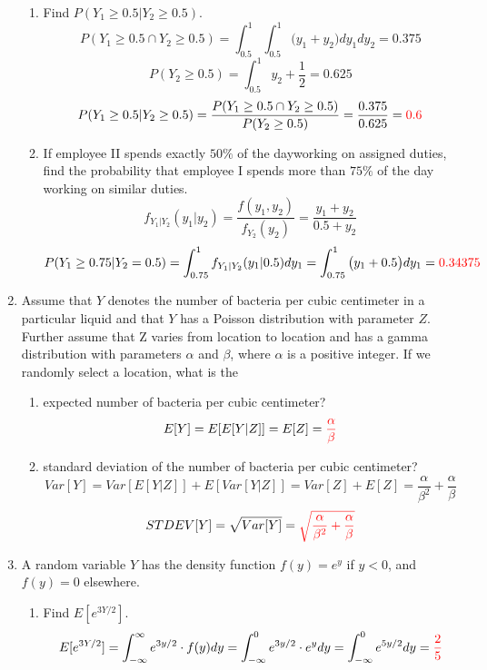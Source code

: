 \documentclass{article}
\newcommand{\intersect}{\cap}
\begin{document}
\begin{enumerate}
\begin{enumerate}
        \item Find $P(Y_1 \geq 0.5|Y_2 \geq 0.5)$.
        \[
            P(Y_1 \geq 0.5 \intersect Y_2 \geq 0.5) = \int_{0.5}^1 \int_{0.5}^1 \big(y_1+y_2\big) dy_1dy_2 = 0.375
        \]
        \[
            P(Y_2 \geq 0.5) = \int_{0.5}^1 y_2+\frac{1}{2} = 0.625
        \]
        \[
            P(Y_1 \geq 0.5|Y_2 \geq 0.5) = \frac{P(Y_1 \geq 0.5 \intersect Y_2 \geq 0.5)}{P(Y_2 \geq 0.5)} = \frac{0.375}{0.625}=\textcolor{red}{0.6}
        \]
        \item If employee II spends exactly $50\%$ of the dayworking on assigned duties, find the
        probability that employee I spends more than $75\%$ of the day working on similar duties.
        \[
            f_{Y_1|Y_2}(y_1|y_2)=\frac{f(y_1,y_2)}{f_{Y_2}(y_2)}=\frac{y_1+y_2}{0.5+y_2}
        \]
        \[
            P(Y_1 \geq 0.75 | Y_2 = 0.5) = \int_{0.75}^1 f_{Y_1|Y_2}(y_1|0.5) dy_1 = \int_{0.75}^1 \big(y_1+0.5\big) dy_1 = \textcolor{red}{0.34375}
        \]
    \end{enumerate}
\pagebreak
    \item Assume that $Y$ denotes the number of bacteria per cubic centimeter in a particular liquid and that $Y$ has a Poisson distribution with parameter $Z$. Further assume that Z varies from location to location and has a gamma distribution with parameters $\alpha$ and $\beta$, where $\alpha$ is a positive integer. If we randomly select a location, what is the
    \begin{enumerate}
        \item expected number of bacteria per cubic centimeter?
        \[
            E[Y] = E[E[Y|Z]]=E[Z]=\textcolor{red}{\frac{\alpha}{\beta}}
        \]
        \item standard deviation of the number of bacteria per cubic centimeter?
        \[
            Var[Y] = Var[E[Y|Z]]+E[Var[Y|Z]]= Var[Z]+E[Z] = \frac{\alpha}{\beta^2}+\frac{\alpha}{\beta}
        \]
        \[
            STDEV[Y]=\sqrt{Var[Y]}=\textcolor{red}{\sqrt{\frac{\alpha}{\beta^2}+\frac{\alpha}{\beta}}}
        \]
    \end{enumerate}
    \item A random variable $Y$ has the density function $f(y) = e^y$ if $y < 0$, and $f(y) = 0$ elsewhere.
    \begin{enumerate}
        \item Find $E[e^{3Y/2}]$.
        \[
            E[e^{3Y/2}]= \int_{-\infty}^{\infty} e^{3y/2} \cdot f(y)dy = \int_{-\infty}^{0} e^{3y/2} \cdot e^y dy = \int_{-\infty}^{0} e^{5y/2} dy = \textcolor{red}{\frac{2}{5}}
\]
\end{enumerate}
\end{enumerate}
\end{document}
